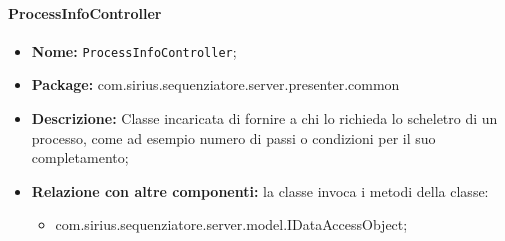 \paragraph{ProcessInfoController}
	\begin{itemize}
		\item \textbf{Nome:} \texttt{ProcessInfoController};
		\item \textbf{Package:} com.sirius.sequenziatore.server.presenter.common
		\item \textbf{Descrizione:} Classe incaricata di fornire a chi lo richieda lo scheletro di un processo, come ad esempio numero di passi o condizioni per il suo completamento;
		\item \textbf{Relazione con altre componenti:} la classe invoca i metodi della classe:
		\begin{itemize}
			\item com.sirius.sequenziatore.server.model.IDataAccessObject;
		\end{itemize}
	\end{itemize}

